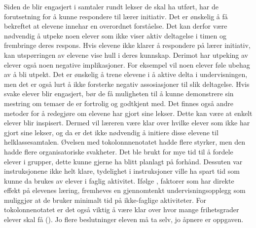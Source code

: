 \documentclass[main.tex]{subfiles}
\begin{document}
Siden de blir engasjert i samtaler rundt lekser de skal ha utført, har de forutsetning for å kunne 
respondere til lærer initiativ. Det er ønskelig å få bekreftet at elevene innehar en overordnet 
forståelse. Det kan derfor være nødvendig å utpeke noen elever som ikke viser aktiv deltagelse i 
timen og frembringe deres respons. Hvis elevene ikke klarer å respondere på lærer initiativ, kan 
utspørringen av elevene vise hull i deres kunnskap. Derimot har utpeking av elever også noen 
negative implikasjoner. For eksempel vil noen elever føle ubehag av å bli utpekt. Det er ønskelig å 
trene elevene i å aktive delta i undervisningen, men det er også lurt å ikke forsterke negativ 
assosiasjoner til slik deltagelse. Hvis svake elever blir engasjert, bør de få muligheten til å 
kunne demonstrere sin mestring om temaer de er fortrolig og godtkjent med. Det finnes også andre 
metoder for å redegjøre om elevene har gjort sine lekser. Dette kan være at enkelt elever blir 
inspisert. Dermed vil læreren være klar over hvilke elever som ikke har gjort sine lekser, og da er 
det ikke nødvendig å initiere disse elevene til helklassesamtalen.
\newline
\newline
Øvelsen med tokolonnnenotatet hadde flere styrker, men den 
hadde flere organisatoriske svakheter. Det ble brukt for mye tid til å fordele elever i grupper, 
dette kunne gjerne ha blitt planlagt på forhånd. Dessuten var instruksjonene ikke helt klare, 
tydelighet i instruksjoner ville ha spart tid som kunne da brukes av elever i faglig aktivitet. 
Ifølge , faktorer som har direkte effekt på elevenes læring, fremheves en 
gjennomtenkt undervisningsopplegg som muliggjør at de bruker minimalt tid på ikke-faglige 
aktiviteter. For tokolonnenotatet er det også viktig å være klar over hvor mange 
frihetsgrader elever skal få (). Jo flere beslutninger eleven må ta selv, jo åpnere 
er oppgaven.
\end{document}
